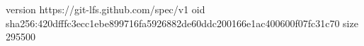 version https://git-lfs.github.com/spec/v1
oid sha256:420dfffc3ecc1ebe899716fa5926882de60ddc200166e1ac400600f07fc31c70
size 295500
